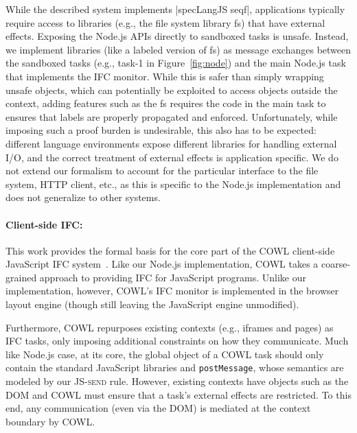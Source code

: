 While the described system implements |specLangJS seqf|, applications
typically require access to libraries (e.g., the file system library
\textsf{fs}) that have external effects.
%
Exposing the Node.js APIs directly to sandboxed tasks is unsafe.
Instead, we implement libraries (like a labeled version of \textsf{fs}) as
message exchanges between the sandboxed tasks (e.g., \textsf{task-1}
in Figure~\ref{fig:node}) and the main Node.js task that implements
the IFC monitor.
%
While this is safer than simply wrapping unsafe objects, which can
potentially be exploited to access objects outside the context, adding
features such as the \textsf{fs} requires the code in the main task to
ensures that labels are properly propagated and enforced.
%
Unfortunately, while imposing such a proof burden
is undesirable, this also has to be expected:
different language environments expose different libraries for
handling external I/O, and the correct treatment of external effects
is application specific.
%
%
%
We do not extend our formalism to account for the  particular
interface to the file system, HTTP client, etc., as this is
specific to the Node.js implementation and does not generalize
to other systems.


\paragraph{Client-side IFC:}
This work provides the formal basis for the core part of the COWL
client-side JavaScript IFC system~\cite{swapi}.
%
Like our Node.js implementation, COWL takes a coarse-grained approach
to providing IFC for JavaScript programs.
%
Unlike our implementation, however, COWL's IFC monitor is implemented in
the browser layout engine (though still leaving the JavaScript engine
unmodified).

Furthermore, COWL repurposes existing contexts (e.g., iframes and
pages) as IFC tasks, only imposing additional constraints on how they
communicate.
%
Much like Node.js case, at its core, the global object of a COWL task
should only contain the standard JavaScript libraries and
\texttt{postMessage}, whose semantics are modeled by our
\textsc{JS-send} rule.
%
However, existing contexts have objects such as the DOM and COWL must
ensure that a task's external effects are restricted.
%
To this end, any communication (even via the DOM) is mediated at
the context boundary by COWL.

